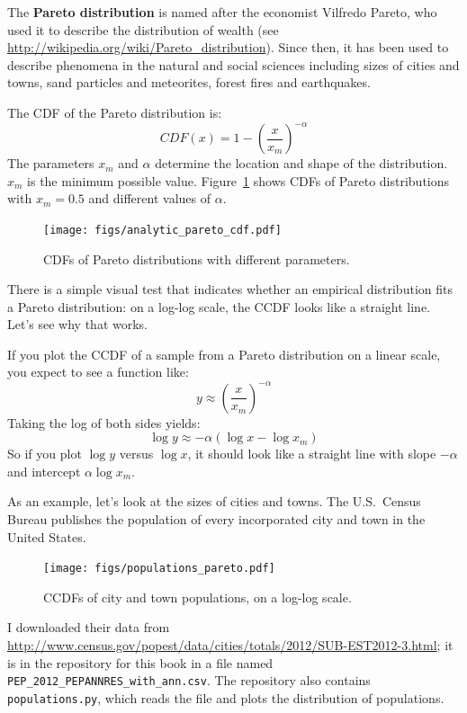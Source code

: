 \documentclass[12pt]{book}
\theoremstyle{exercise}
\begin{document}
The {\bf Pareto distribution} is named after the economist Vilfredo Pareto,
who used it to describe the distribution of wealth (see
\url{http://wikipedia.org/wiki/Pareto_distribution}).  Since then, it
has been used to describe phenomena in the natural and social sciences
including sizes of cities and towns, sand particles and meteorites,
forest fires and earthquakes.%

The CDF of the Pareto distribution is:
%
\[ CDF(x) = 1 - \left( \frac{x}{x_m} \right) ^{-\alpha} \]
%
The parameters $x_{m}$ and $\alpha$ determine the location and shape
of the distribution. $x_{m}$ is the minimum possible value.
Figure~\ref{analytic_pareto_cdf} shows CDFs of Pareto
distributions with $x_{m} = 0.5$ and different values
of $\alpha$.%

\begin{figure}
\centerline{\texttt{[image: figs/analytic\_pareto\_cdf.pdf]}}
\caption{CDFs of Pareto distributions with different parameters.}%
\label{analytic_pareto_cdf}
\end{figure}

There is a simple visual test that indicates whether an empirical
distribution fits a Pareto distribution: on a log-log scale, the CCDF
looks like a straight line.  Let's see why that works.

If you plot the CCDF of a sample from a Pareto distribution on a
linear scale, you expect to see a function like:
%
\[ y \approx \left( \frac{x}{x_m} \right) ^{-\alpha} \]
%
Taking the log of both sides yields:
%
\[ \log y \approx -\alpha (\log x - \log x_{m})\]
%
So if you plot $\log y$ versus $\log x$, it should look like a straight
line with slope $-\alpha$ and intercept
$\alpha \log x_{m}$.

As an example, let's look at the sizes of cities and towns.
The U.S.~Census Bureau publishes the
population of every incorporated city and town in the United States.%
%
%
%
%

\begin{figure}
\centerline{\texttt{[image: figs/populations\_pareto.pdf]}}
\caption{CCDFs of city and town populations, on a log-log scale.}%
\label{populations_pareto}
\end{figure}

I downloaded their data from
\url{http://www.census.gov/popest/data/cities/totals/2012/SUB-EST2012-3.html};
it is in the repository for this book in a file named
\verb"PEP_2012_PEPANNRES_with_ann.csv".  The repository also
contains {\tt populations.py}, which reads the file and plots
the distribution of populations.
\end{document}
